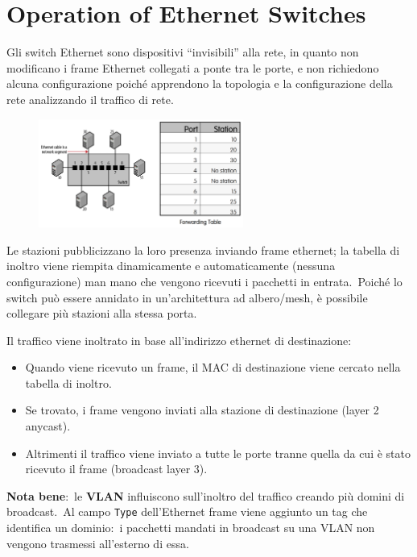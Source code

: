 \section{Operation of Ethernet Switches}

Gli switch Ethernet sono dispositivi ``invisibili'' alla rete, in quanto non modificano i frame Ethernet collegati a ponte tra le porte, e non richiedono alcuna configurazione poiché apprendono la topologia e la configurazione della rete analizzando il traffico di rete.

\begin{figure}[H]
    \centering
    \includegraphics[width=0.6\textwidth]{immagini/Switch.png}
\end{figure}

\noindent Le stazioni pubblicizzano la loro presenza inviando frame ethernet; la tabella di inoltro viene riempita dinamicamente e automaticamente (nessuna configurazione) man mano che vengono ricevuti i pacchetti in entrata.\
Poiché lo switch può essere annidato in un'architettura ad albero{\slash}mesh, è possibile collegare più stazioni alla stessa porta.

Il traffico viene inoltrato in base all'indirizzo ethernet di destinazione:

\begin{itemize}
    \item Quando viene ricevuto un frame, il MAC di destinazione viene cercato nella tabella di inoltro.
    \item Se trovato, i frame vengono inviati alla stazione di destinazione (layer 2 anycast).
    \item Altrimenti il traffico viene inviato a tutte le porte tranne quella da cui è stato ricevuto il frame (broadcast layer 3).
\end{itemize}

\noindent\textbf{Nota bene}:\ le \textbf{VLAN} influiscono sull'inoltro del traffico creando più domini di broadcast.\
Al campo \texttt{Type} dell'Ethernet frame viene aggiunto un tag che identifica un dominio:\ i pacchetti mandati in broadcast su una VLAN non vengono trasmessi all'esterno di essa.

